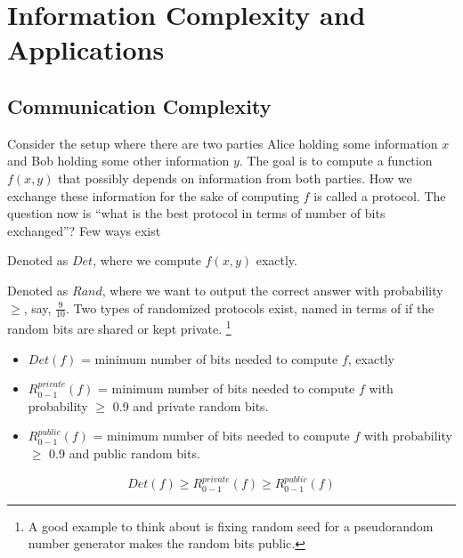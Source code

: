 \chapter{Information Complexity and Applications}

\section{Communication Complexity}
Consider the setup where there are two parties Alice holding some information $x$ and Bob holding some other information $y$. The goal is to compute a function $f(x, y)$ that possibly depends on information from both parties. How we exchange these information for the sake of computing $f$ is called a protocol. The question now is ``what is the best protocol in terms of number of bits exchanged''? Few ways exist

\begin{definition}
	Denoted as $Det$, where we compute $f(x, y)$ exactly. 
\end{definition}

\begin{definition}
	Denoted as $Rand$, where we want to output the correct answer with probability $\geq$, say, $\frac{9}{10}$. Two types of randomized protocols exist, named in terms of if the random bits are shared or kept private. \footnote{A good example to think about is fixing random seed for a pseudorandom number generator makes the random bits public.}
\end{definition}

\begin{definition}
	\begin{itemize}
		\item $Det(f)$ = minimum number of bits needed to compute $f$, exactly
		\item $R_{0-1}^{private}(f)$ = minimum number of bits needed to compute $f$ with probability $\geq$ 0.9 and private random bits. 
		\item $R_{0-1}^{public}(f)$ = minimum number of bits needed to compute $f$ with probability $\geq$ 0.9 and public random bits.
	\end{itemize}
\end{definition}

\begin{proposition}
	\begin{equation}
		Det(f) \geq R_{0-1}^{private}(f) \geq R_{0-1}^{public}(f)
	\end{equation}
\end{proposition}

